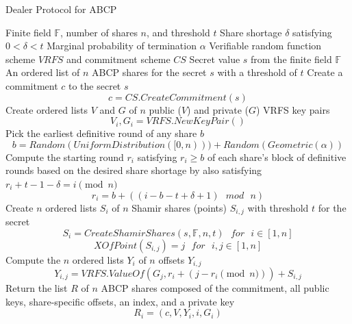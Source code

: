 \documentclass[12pt]{dalcsthesis}
\begin{document}
\begin{algorithm}
  \caption{Dealer Protocol for ABCP}
  \label{alg:ABCP:Dealer}
  \begin{algorithmic}
    \INPUT Finite field $\mathbb{F}$, number of shares $n$, and threshold $t$
    \INPUT Share shortage $\delta$ satisfying $0 < \delta < t$
    \INPUT Marginal probability of termination $\alpha$
    \INPUT Verifiable random function scheme $VRFS$ and commitment scheme $CS$
    \INPUT Secret value $s$ from the finite field $\mathbb{F}$
    \OUTPUT An ordered list of $n$ ABCP shares for the secret $s$ with a threshold of $t$
    \STATE Create a commitment $c$ to the secret $s$
    	$$c = CS.CreateCommitment(s)$$
    \STATE Create ordered lists $V$ and $G$ of $n$ public ($V$) and private ($G$) VRFS key pairs
    	$$V_i, G_i = VRFS.NewKeyPair()$$
    \STATE Pick the earliest definitive round of any share $b$ 
	    $$b = Random(UniformDistribution([0,n))) + Random(Geometric(\alpha))$$
    \STATE Compute the starting round $r_i$ satisfying $r_i \geq b$ of each share's block of definitive rounds based on the desired share shortage by also satisfying $r_i + t - 1 - \delta = i \pmod{n}$
  	    $$r_i = b + ((i-b-t+\delta+1) \text{ } mod \text{ } n)$$
    \STATE Create $n$ ordered lists $S_i$ of $n$ Shamir shares (points) $S_{i,j}$ with threshold $t$ for the secret
  	    $$S_i = CreateShamirShares(s, \mathbb{F}, n, t) \text{ } for \text{ } i \in [1, n]$$
  	    $$XOfPoint(S_{i,j}) = j \text{ } for \text{ } i,j \in [1, n]$$
    \STATE Compute the $n$ ordered lists $Y_i$ of $n$ offsets $Y_{i,j}$
  	    $$Y_{i,j} = VRFS.ValueOf(G_j, r_i + (j-r_i \pmod{n})) + S_{i,j}$$
    \STATE Return the list $R$ of $n$ ABCP shares composed of the commitment, all public keys, share-specific offsets, an index, and a private key
    	$$R_i = (c, V, Y_i, i, G_i)$$
  \end{algorithmic}
\end{algorithm}
\end{document}

